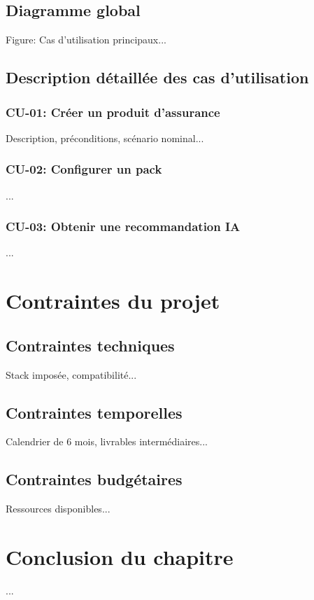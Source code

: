 \documentclass[12pt,a4paper]{report}
\begin{document}
\subsection{Diagramme global}
Figure: Cas d'utilisation principaux...

\subsection{Description détaillée des cas d'utilisation}
\subsubsection{CU-01: Créer un produit d'assurance}
Description, préconditions, scénario nominal...

\subsubsection{CU-02: Configurer un pack}
...

\subsubsection{CU-03: Obtenir une recommandation IA}
...

\section{Contraintes du projet}
\subsection{Contraintes techniques}
Stack imposée, compatibilité...

\subsection{Contraintes temporelles}
Calendrier de 6 mois, livrables intermédiaires...

\subsection{Contraintes budgétaires}
Ressources disponibles...

\section{Conclusion du chapitre}
...

\end{document}

